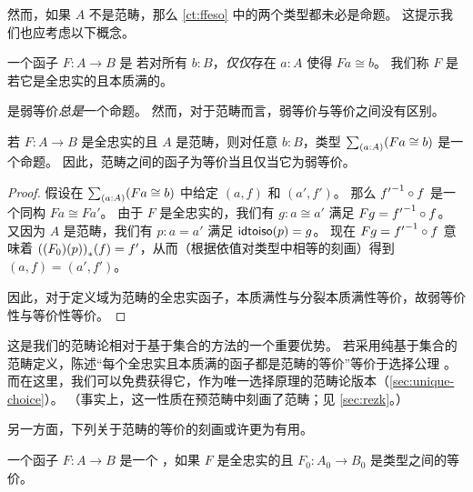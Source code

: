 然而，如果 $A$ 不是范畴，那么 \cref{ct:ffeso} 中的两个类型都未必是命题。
这提示我们也应考虑以下概念。

\begin{defn}\label{ct:essentially-surjective}
  一个函子 $F:A\to B$ 是
  若对所有 $b:B$，\emph{仅仅}存在 $a:A$ 使得 $Fa\cong b$。
  我们称 $F$ 是
  若它是全忠实的且本质满的。
\end{defn}

是弱等价\emph{总是}一个命题。
然而，对于范畴而言，弱等价与等价之间没有区别。



\begin{lem}\label{ct:catweq}
  若 $F:A\to B$ 是全忠实的且 $A$ 是范畴，则对任意 $b:B$，类型 $\sm{a:A} (Fa\cong b)$ 是一个命题。
  因此，范畴之间的函子为等价当且仅当它为弱等价。
\end{lem}

\begin{proof}
  假设在 $\sm{a:A} (Fa\cong b)$ 中给定 $(a,f)$ 和 $(a',f')$。
  那么 ${f'}^{-1}\circ f$ 是一个同构 $Fa \cong Fa'$。
  由于 $F$ 是全忠实的，我们有 $g:a\cong a'$ 满足 $Fg = {f'}^{-1}\circ f$。
  又因为 $A$ 是范畴，我们有 $p:a=a'$ 满足 $\mathsf{idtoiso}(p)=g$。
  现在 $Fg = {f'}^{-1}\circ f$ 意味着 ${({(F_0)}\mathopen{}\left({p}\right)\mathclose{})}_{*}\mathopen{}\left({f}\right)\mathclose{} = f'$，从而（根据依值对类型中相等的刻画）得到 $(a,f)=(a',f')$。

  因此，对于定义域为范畴的全忠实函子，本质满性与分裂本质满性等价，故弱等价性与等价性等价。
\end{proof}

这是我们的范畴论相对于基于集合的方法的一个重要优势。
若采用纯基于集合的范畴定义，陈述``每个全忠实且本质满的函子都是范畴的等价''等价于选择公理 \choice{}。
而在这里，我们可以免费获得它，作为唯一选择原理的范畴论版本（\cref{sec:unique-choice}）。
（事实上，这一性质在预范畴中刻画了范畴；见 \cref{sec:rezk}。）

另一方面，下列关于范畴的等价的刻画或许更为有用。

\begin{defn}\label{ct:isocat}
  一个函子 $F:A\to B$ 是一个
  ，如果 $F$ 是全忠实的且 $F_0:A_0\to B_0$ 是类型之间的等价。
\end{defn}

